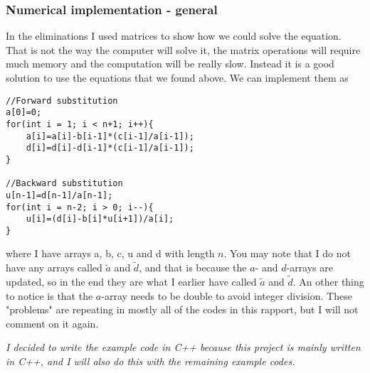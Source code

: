 \documentclass{scrartcl}
\begin{document}
\subsubsection{Numerical implementation - general}
In the eliminations I used matrices to show how we could solve the equation. That is not the way the computer will solve it, the matrix operations will require much memory and the computation will be really slow. Instead it is a good solution to use the equations that we found above. We can implement them as
\begin{lstlisting}
//Forward substitution
a[0]=0;
for(int i = 1; i < n+1; i++){
    a[i]=a[i]-b[i-1]*(c[i-1]/a[i-1]);
    d[i]=d[i]-d[i-1]*(c[i-1]/a[i-1]);
}

//Backward substitution
u[n-1]=d[n-1]/a[n-1];
for(int i = n-2; i > 0; i--){
    u[i]=(d[i]-b[i]*u[i+1])/a[i];
}
\end{lstlisting}
where I have arrays a, b, c, u and d with length $n$. You may note that I do not have any arrays called $\tilde{a}$ and $\tilde{d}$, and that is because the $a$- and $d$-arrays are updated, so in the end they are what I earlier have called $\tilde{a}$ and $\tilde{d}$. An other thing to notice is that the $a$-array needs to be double to avoid integer division. These "problems" are repeating in mostly all of the codes in this rapport, but I will not comment on it again.\par\vspace{3mm} \textit{I decided to write the example code in C++ because this project is mainly written in C++, and I will also do this with the remaining example codes.}
\end{document}
